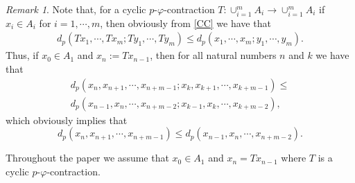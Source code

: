 \documentclass{amsart}
\theoremstyle{definition}
\theoremstyle{remark}
\newtheorem{remark}[theorem]{Remark}
\begin{document}
\begin{remark}
Note that, for a cyclic $p$-$\varphi$-contraction $T:\cup_{i=1}^mA_i\to\cup_{i=1}^mA_i$ if $x_i\in A_i$ for $i=1,\cdots,m$, then obviously from \eqref{CC} we have that \begin{eqnarray}\label{FP8}d_p(Tx_1,\cdots,Tx_m;Ty_1,\cdots,Ty_m)\leq d_p(x_1,\cdots,x_m;y_1,\cdots,y_m).\end{eqnarray} Thus, if $x_0\in A_1$ and $x_n:=Tx_{n-1}$, then for all natural numbers $n$ and $k$ we have that
\begin{eqnarray*}d_p(x_n,x_{n+1},\cdots,x_{n+m-1};x_k,x_{k+1},\cdots,x_{k+m-1})\leq\\ d_p(x_{n-1},x_n,\cdots,x_{n+m-2};x_{k-1},x_k,\cdots,x_{k+m-2}),\end{eqnarray*} which obviously implies that
$$d_p(x_n,x_{n+1},\cdots,x_{n+m-1})\leq d_p(x_{n-1},x_n,\cdots,x_{n+m-2}).$$
\end{remark}
Throughout the paper we assume that $x_0\in A_1$ and $x_n=Tx_{n-1}$ where $T$ is a cyclic $p$-$\varphi$-contraction.
\end{document}
